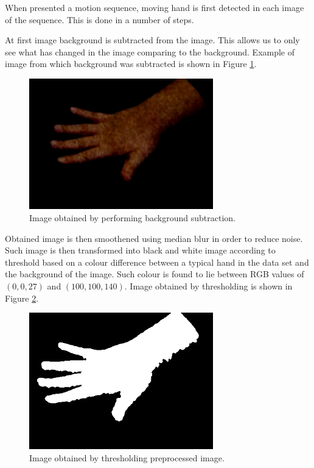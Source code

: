 When presented a motion sequence, moving hand is first detected in each image of the sequence. This is done in a number of steps.

At first image background is subtracted from the image. This allows us to only see what has changed in the image comparing to the background. Example of image from which background was subtracted is shown in Figure \ref{fig:bgsub}.

\begin{figure}
\begin{center}
\includegraphics[width=80mm]{bgsub.png}
\caption{Image obtained by performing background subtraction.}
\label{fig:bgsub}
\end{center}
\end{figure}


Obtained image is then smoothened using median blur in order to reduce noise. Such image is then transformed into black and white image according to threshold based on a colour difference between a typical hand in the data set and the background of the image. Such colour is found to lie between RGB values of $(0, 0, 27)$ and $(100, 100, 140)$. Image obtained by thresholding is shown in Figure \ref{fig:bw}.

\begin{figure}
\begin{center}
\includegraphics[width=80mm]{bw.png}
\caption{Image obtained by thresholding preprocessed image.}
\label{fig:bw}
\end{center}
\end{figure}



